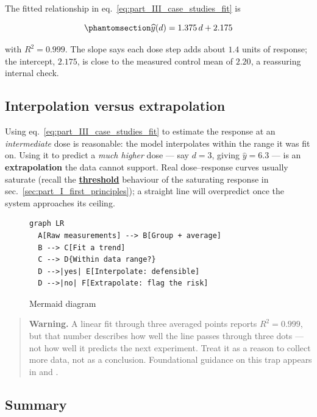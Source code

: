 \documentclass[
]{article}
\theoremstyle{plain}
\theoremstyle{definition}
\begin{document}
The fitted relationship in eq.~\ref{eq:part_III_case_studies_fit} is

\begin{equation}\protect\phantomsection\label{eq:part_III_case_studies_fit}{ \widehat{y}(d) = 1.375\,d + 2.175 }\end{equation}

with \(R^2 = 0.999\). The slope says each dose step adds about \(1.4\)
units of response; the intercept, \(2.175\), is close to the measured
control mean of \(2.20\), a reassuring internal check.

\subsection{Interpolation versus
extrapolation}\label{interpolation-versus-extrapolation}

Using eq.~\ref{eq:part_III_case_studies_fit} to estimate the response at
an \emph{intermediate} dose is reasonable: the model interpolates within
the range it was fit on. Using it to predict a \emph{much higher} dose
--- say \(d = 3\), giving \(\widehat{y} = 6.3\) --- is an
\textbf{extrapolation} the data cannot support. Real dose--response
curves usually saturate (recall the
\hyperref[gl:threshold]{\textbf{threshold}} behaviour of the saturating
response in sec.~\ref{sec:part_I_first_principles}); a straight line
will overpredict once the system approaches its ceiling.

\begin{figure}[htbp]
\centering
\begin{verbatim}
graph LR
  A[Raw measurements] --> B[Group + average]
  B --> C[Fit a trend]
  C --> D{Within data range?}
  D -->|yes| E[Interpolate: defensible]
  D -->|no| F[Extrapolate: flag the risk]
\end{verbatim}
\caption{Mermaid diagram}
\end{figure}

\begin{quote}
\textbf{Warning.} A linear fit through three averaged points reports
\(R^2 = 0.999\), but that number describes how well the line passes
through three dots --- not how well it predicts the next experiment.
Treat it as a reason to collect more data, not as a conclusion.
Foundational guidance on this trap appears in \citep{kim2020data} and
\citep{wilson2021analysis}.
\end{quote}

\subsection{Summary}\label{summary-10}
\end{document}
